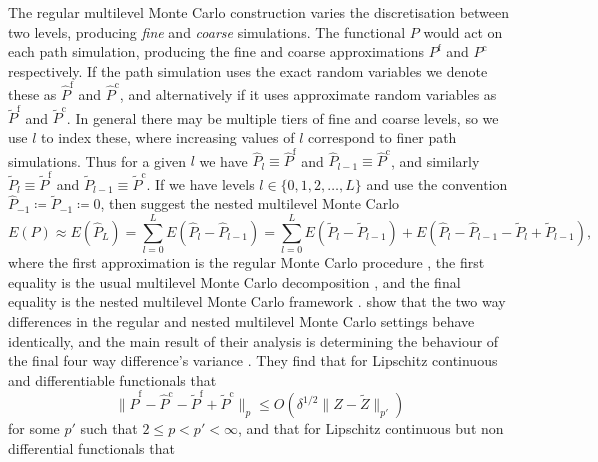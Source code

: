 \documentclass[manuscript,review]{acmart}
\begin{document}
The regular multilevel Monte Carlo construction varies the discretisation between two levels, producing \emph{fine} and \emph{coarse} simulations. The functional $ P $ would act on each path simulation, producing the fine and coarse approximations $ P^{\mathrm{f}} $ and $ P^{\mathrm{c}} $ respectively. If the path simulation uses the exact random variables we denote these as $ \hat{P}^{\mathrm{f}} $ and $ \hat{P}^{\mathrm{c}} $, and alternatively if it uses approximate random variables as $ \tilde{P}^{\mathrm{f}} $ and $ \tilde{P}^{\mathrm{c}} $. In general there may be multiple tiers of fine and coarse levels, so we use $ l $ to index these, where increasing values of $ l $ correspond to finer path simulations. Thus for a given $ l $ we have $ \hat{P}_l \equiv \hat{P}^{\mathrm{f}} $ and $ \hat{P}_{l-1} \equiv \hat{P}^{\mathrm{c}} $, and similarly $ \tilde{P}_l \equiv \tilde{P}^{\mathrm{f}} $ and $ \tilde{P}_{l-1} \equiv \tilde{P}^{\mathrm{c}} $. If we have levels $ l \in \{0, 1, 2, \ldots, L\} $ and use the convention $ \hat{P}_{-1} \coloneqq \tilde{P}_{-1} \coloneqq 0 $, then \citet{giles2020approximate} suggest the nested multilevel Monte Carlo
\begin{equation*}
E(P) 
\approx
E(\hat{P}_L) 
= 
\sum_{l = 0}^{L} E(\hat{P}_l - \hat{P}_{l-1}) 
= 
\sum_{l = 0}^{L} E(\tilde{P}_l - \tilde{P}_{l-1}) +  E(\hat{P}_l - \hat{P}_{l-1} - \tilde{P}_l + \tilde{P}_{l-1}),
\end{equation*}
where the first approximation is the regular Monte Carlo procedure \citep{glasserman2013monte}, the first equality is the usual multilevel Monte Carlo decomposition \citep{giles2008multilevel}, and the final equality is the nested multilevel Monte Carlo framework \citep{giles2020approximate,sheridan2020nested}.
\citeauthor{giles2020approximate} \citep{giles2020approximate,sheridan2020nested} show that the two way differences in the regular and nested multilevel Monte Carlo settings behave identically, and the main result of their analysis is determining the behaviour of the final four way difference's variance \citep[lemmas~4.10 and 4.11]{giles2020approximate} \citep[corollaries~6.2.6.2 and 6.2.6.3]{sheridan2020nested}. They find that for Lipschitz continuous and differentiable functionals that 
\begin{equation*}
\lVert \hat{P}^{\mathrm{f}} - \hat{P}^{\mathrm{c}} - \tilde{P}^{\mathrm{f}} + \tilde{P}^{\mathrm{c}}\rVert_p 
\leq O(\delta^{1/2} \lVert Z - \tilde{Z} \rVert_{p'}) 
\end{equation*}
for some  $ p' $ such that $ 2 \leq p < p' < \infty $, and that for Lipschitz continuous but non differential functionals that 
\end{document}
